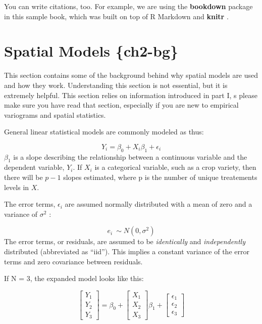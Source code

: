 \documentclass[]{book}
\begin{document}
You can write citations, too. For example, we are using the \textbf{bookdown} package \citep{R-bookdown} in this sample book, which was built on top of R Markdown and \textbf{knitr} \citep{xie2015}.

\hypertarget{spatial-models-ch2-bg}{%
\chapter{Spatial Models \{ch2-bg\}}\label{spatial-models-ch2-bg}}

This section contains some of the background behind why spatial models are used and how they work. Understanding this section is not essential, but it is extremely helpful. This section relies on information introduced in part I, s please make sure you have read that section, especially if you are new to empirical variograms and spatial statistics.

General linear statistical models are commonly modeled as thus:

\[Y_i = \beta_0 + X_i\beta_1 + \epsilon_i\]
\(\beta_1\) is a slope describing the relationship between a continuous variable and the dependent variable, \(Y_i\). If \(X_i\) is a categorical variable, such as a crop variety, then there will be \(p-1\) slopes estimated, where p is the number of unique treatements levels in \(X\).

The error terms, \(\epsilon_i\) are assumed normally distributed with a mean of zero and a variance of \(\sigma^2\) :

\[e_i ~\sim N(0, \sigma^2)\]
The error terms, or residuals, are assumed to be \emph{identically} and \emph{independently} distributed (abbreviated as ``iid''). This implies a constant variance of the error terms and zero covariance between residuals.

If N = 3, the expanded model looks like this:

\[\left[ {\begin{array}{ccc} Y_1\\ Y_2\\ Y_3 \end{array} } \right] = \beta_0 + 
\left[ {\begin{array}{ccc} X_1\\ X_2\\ X_3 \end{array}  } \right] \beta_1 +
\left[ {\begin{array}{ccc} \epsilon_1\\ \epsilon_2\\ \epsilon_3 \end{array}  } \right] \]
\end{document}
